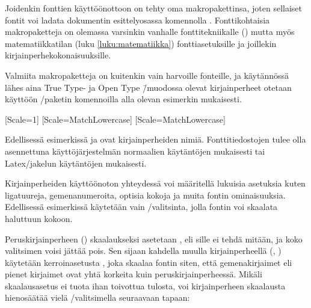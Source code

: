 
Joidenkin fonttien käyttöönottoon on tehty oma makropakettinsa, joten
sellaiset fontit voi ladata dokumentin esittelyosassa komennolla
. Fonttikohtaisia makropaketteja on olemassa
varsinkin vanhalle fonttitekniikalle () mutta myös matematiikkatilan (luku \ref{luku:matematiikka})
fonttiasetuksille ja joillekin kir\-jain\-perhe\-koko\-nai\-suuk\-sille.

Valmiita makropaketteja on kuitenkin vain harvoille fonteille, ja
käytännössä lähes aina True Type- ja Open Type \=/muodossa olevat
kirjainperheet otetaan käyttöön \-/paketin komennoilla
alla olevan esimerkin mukaisesti.

\begin{koodilohkosis}
  \setmainfont{TeX Gyre Termes}[Scale=1]
  \setsansfont{TeX Gyre Heros} [Scale=MatchLowercase]
  \setmonofont{TeX Gyre Cursor}[Scale=MatchLowercase]
\end{koodilohkosis}

Edellisessä esimerkissä  ja
 ovat kirjainperheiden nimiä. Fonttitiedostojen
tulee olla asennettuna käyttöjärjestelmän normaalien käytäntöjen
mukaisesti tai Latex\-/jakelun käytäntöjen mukaisesti.

Kirjainperheiden käyttöönoton yhteydessä voi määritellä lukuisia
asetuksia kuten ligatuureja, gemenanumeroita, optisia kokoja ja muita
fontin ominaisuuksia. Edellisessä esimerkissä käytetään vain
\-/valitsinta, jolla fontin voi skaalata haluttuun kokoon.

Peruskirjainperheen () skaalaukseksi
asetetaan , eli sille ei tehdä mitään, ja koko valitsimen
voisi jättää pois. Sen sijaan kahdella muulla kirjainperheellä
(, ) käytetään
ker\-roin\-ase\-tus\-ta , joka skaalaa fontin
siten, että gemenakirjaimet eli pienet kirjaimet ovat yhtä korkeita kuin
peruskirjainperheessä. Mikäli skaa\-laus\-ase\-tus
 ei tuota ihan toivottua tulosta, voi
kirjainperheen skaalausta hienosäätää vielä
\-/valitsimella seuraavaan tapaan:


